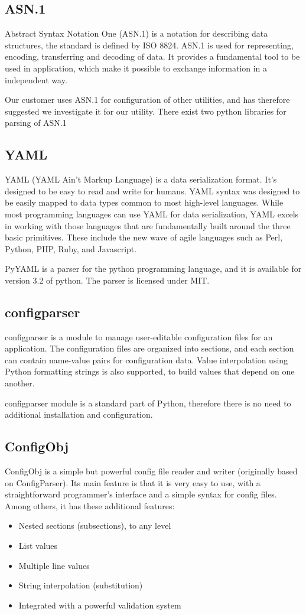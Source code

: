 \subsection{ASN.1}
Abstract Syntax Notation One (ASN.1) is a notation for describing data
structures, the standard is defined by ISO 8824. ASN.1 is used for
representing, encoding, transferring and decoding of data. It provides a
fundamental tool to be used in application, which make it possible to exchange
information in a independent way.

Our customer uses ASN.1 for configuration of other utilities, and has therefore
suggested we investigate it for our utility. There exist two python libraries
for parsing of ASN.1

\subsection{YAML}
YAML (YAML Ain't Markup Language) is a data serialization format. It's designed
to be easy to read and write for humans. YAML syntax was designed to be easily
mapped to data types common to most high-level languages. While most
programming languages can use YAML for data serialization, YAML excels in
working with those languages that are fundamentally built around the three
basic primitives. These include the new wave of agile languages such as Perl,
Python, PHP, Ruby, and Javascript.

PyYAML is a parser for the python programming language, and it is available for
version 3.2 of python. The parser is licensed under MIT.

\subsection{configparser}
configparser is a module to manage user-editable configuration files for an
application. The configuration files are organized into sections, and each
section can contain name-value pairs for configuration data. Value
interpolation using Python formatting strings is also supported, to build
values that depend on one another.

configparser module is a standard part of Python, therefore there is no need
to additional installation and configuration.

\subsection{ConfigObj}
ConfigObj is a simple but powerful config file reader and writer (originally
based on ConfigParser). Its main feature is that it is very easy to use, with
a straightforward programmer's interface and a simple syntax for config files.
Among others, it has these additional features:
\begin{itemize}
	\item Nested sections (subsections), to any level
	\item List values
	\item Multiple line values
	\item String interpolation (substitution)
	\item Integrated with a powerful validation system
\end{itemize}

